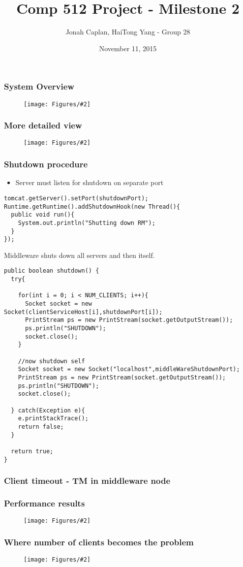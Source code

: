 \documentclass[10pt]{beamer}
\title[Comp 512 Project - Milestone 2]{Comp 512 Project - Milestone 2} %
\author{Jonah Caplan, HaiTong Yang - Group 28} %
\institute %
{
McGill University \\ %
\medskip
\textit{jonah.caplan@mail.mcgill.ca,hai.yang@mail.mcgill.ca} %
}
\date{November 11, 2015} %
\newcommand{\addfigure}[2]{

\begin{figure}[h]
	\centering
	\texttt{[image: Figures/\#2]} 
\end{figure}

}
\begin{document}
\begin{frame}
\titlepage %
\end{frame}


\begin{frame}
\frametitle{System Overview}
\addfigure{0.5}{system.pdf}
\end{frame}

\begin{frame}
\frametitle{More detailed view}
\addfigure{0.3}{sequence.pdf}
\end{frame}

\begin{frame}[fragile]
\frametitle{Shutdown procedure}
\begin{itemize}
  \item Server must listen for shutdown on separate port
\end{itemize}
\begin{lstlisting}
tomcat.getServer().setPort(shutdownPort);
Runtime.getRuntime().addShutdownHook(new Thread(){
  public void run(){
    System.out.println("Shutting down RM");
  }
}); 
\end{lstlisting}
\end{frame}

\begin{frame}[fragile]
Middleware shuts down all servers and then itself.

\begin{lstlisting}
public boolean shutdown() {
  try{
    
    for(int i = 0; i < NUM_CLIENTS; i++){
      Socket socket = new Socket(clientServiceHost[i],shutdownPort[i]);
      PrintStream ps = new PrintStream(socket.getOutputStream());
      ps.println("SHUTDOWN");
      socket.close();
    }
    
    //now shutdown self
    Socket socket = new Socket("localhost",middleWareShutdownPort);
    PrintStream ps = new PrintStream(socket.getOutputStream());
    ps.println("SHUTDOWN");
    socket.close();
    
  } catch(Exception e){
    e.printStackTrace();
    return false;
  }
  
  return true;
}
\end{lstlisting}
\end{frame}


\begin{frame}
\frametitle{Client timeout - TM in middleware node}
\begin{algorithm}[H]
 
 
 \end{algorithm}

\end{frame}


\begin{frame}
\frametitle{Performance results}
\addfigure{0.4}{performance.pdf}
\end{frame}

\begin{frame}
\frametitle{Where number of clients becomes the problem}
\addfigure{0.4}{clients.pdf}
\end{frame}
\end{document}
